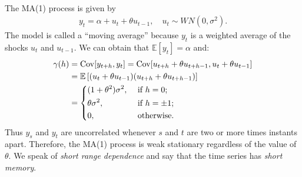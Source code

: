 \begin{eg}[MA(1) Process]\label{eg:MA1}
    \
    
    The MA(1) process is given by
    \begin{gather}\label{eq:MA1}
        y_t = \alpha + u_t + \theta u_{t-1}, \quad u_t \sim WN(0, \sigma^2).
    \end{gather}
    The model is called a ``moving average'' because $y_t$ is a weighted average of the shocks $u_t$ and $u_{t-1}$.
    We can obtain that $\mathbb{E}[y_t] = \alpha$ and:
    \begin{align*}
        \gamma(h) &= \operatorname{Cov}[y_{t+h}, y_t] = \operatorname{Cov}[u_{t+h} + \theta u_{t+h-1}, u_t + \theta u_{t-1}]\\
        &= \mathbb{E}\left[(u_t + \theta u_{t-1})(u_{t+h} + \theta u_{t+h-1})\right]\\
        &= \begin{dcases}
            (1+\theta^2) \sigma^2, &\text{ if } h = 0;\\
            \theta \sigma^2, &\text{ if } h = \pm1;\\
            0, &\text{ otherwise} .
        \end{dcases}
    \end{align*}
    Thus $y_s$ and $y_t$ are uncorrelated whenever $s$ and $t$ are two or more times instants apart.
    Therefore, the MA(1) process is weak stationary regardless of the value of $\theta$.
    We speak of \textit{short range dependence} and say that the time series has \textit{short memory}.
\end{eg}





